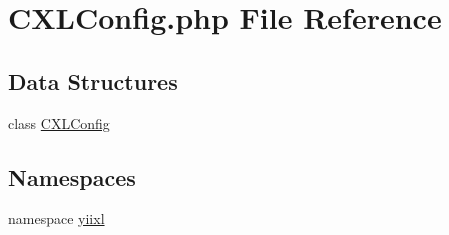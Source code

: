 \hypertarget{CXLConfig_8php}{
\section{CXLConfig.php File Reference}
\label{CXLConfig_8php}
}
\subsection*{Data Structures}
\begin{DoxyCompactItemize}
\item 
class \hyperlink{classCXLConfig}{CXLConfig}
\end{DoxyCompactItemize}
\subsection*{Namespaces}
\begin{DoxyCompactItemize}
\item 
namespace \hyperlink{namespaceyiixl}{yiixl}
\end{DoxyCompactItemize}
